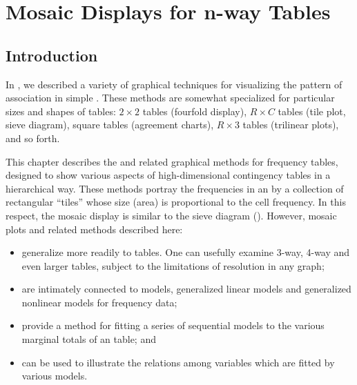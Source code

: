 \documentclass[10pt,krantz2]{krantz}\usepackage[]{graphicx}\usepackage[]{color}
\begin{document}


\chapter{Mosaic Displays for n-way Tables}\label{ch:mosaic}


\section{Introduction}\label{sec:mosaic-intro}


In , we described a variety of graphical techniques
for visualizing the pattern of association in simple \ctabs.
These methods are somewhat specialized for particular
sizes and shapes of tables:
$2 \times 2$ tables (fourfold display),
$R \times C$ tables (tile plot, sieve diagram),
square tables (agreement charts),
$R \times 3$ tables (trilinear plots), and so forth.

This chapter describes the
 and related graphical methods
for \nway frequency tables, designed to show
various aspects of high-dimensional contingency tables in a hierarchical way.
These methods portray the
frequencies in an \nway
\ctab  by a collection of rectangular ``tiles''
whose size (area) is proportional to the cell frequency.
In this respect, the mosaic display is similar to the sieve diagram ().
However, mosaic plots and related methods described here:
\begin{itemize}
\item generalize more readily to \nway tables.  One can usefully examine
3-way, 4-way and even larger tables, subject to the limitations
of resolution in any graph;
\item are intimately connected to \loglin models, generalized linear models
and generalized nonlinear models for frequency data;
\item provide a method for fitting a series of sequential \loglin
models to the various marginal totals of an \nway table; and
\item can be used to illustrate the relations among variables which
are fitted by various \loglin models.
\end{itemize}
\end{document}
